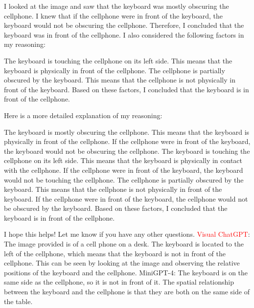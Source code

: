 \begin{enumerate}
        I looked at the image and saw that the keyboard was mostly obscuring the cellphone.
        I knew that if the cellphone were in front of the keyboard, the keyboard would not be obscuring the cellphone.
        Therefore, I concluded that the keyboard was in front of the cellphone.
        I also considered the following factors in my reasoning:
        
        The keyboard is touching the cellphone on its left side. This means that the keyboard is physically in front of the cellphone.
        The cellphone is partially obscured by the keyboard. This means that the cellphone is not physically in front of the keyboard.
        Based on these factors, I concluded that the keyboard is in front of the cellphone.
        
        Here is a more detailed explanation of my reasoning:
        
        The keyboard is mostly obscuring the cellphone. This means that the keyboard is physically in front of the cellphone. If the cellphone were in front of the keyboard, the keyboard would not be obscuring the cellphone.
        The keyboard is touching the cellphone on its left side. This means that the keyboard is physically in contact with the cellphone. If the cellphone were in front of the keyboard, the keyboard would not be touching the cellphone.
        The cellphone is partially obscured by the keyboard. This means that the cellphone is not physically in front of the keyboard. If the cellphone were in front of the keyboard, the cellphone would not be obscured by the keyboard.
        Based on these factors, I concluded that the keyboard is in front of the cellphone.
        
        I hope this helps! Let me know if you have any other questions.
        \subitem \textcolor{red}{Visual ChatGPT}: The image provided is of a cell phone on a desk. The keyboard is located to the left of the cellphone, which means that the keyboard is not in front of the cellphone. This can be seen by looking at the image and observing the relative positions of the keyboard and the cellphone.
        \subitem MiniGPT-4: The keyboard is on the same side as the cellphone, so it is not in front of it. The spatial relationship between the keyboard and the cellphone is that they are both on the same side of the table.
    \end{enumerate}

